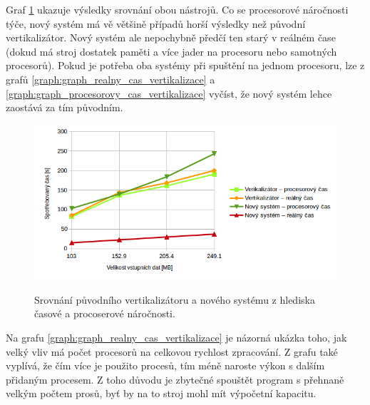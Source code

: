 Graf \ref{graph:graph_vertikalizator_vs_ja} ukazuje výsledky srovnání obou nástrojů.
Co se procesorové náročnosti týče, nový systém má vě většině případů horší výsledky
než původní vertikalizátor. Nový systém ale nepochybně předčí ten starý v reálném
čase (dokud má stroj dostatek paměti a více jader na procesoru nebo samotných procesorů). Pokud
je potřeba oba systémy při spuštění na jednom procesoru, lze z grafů \ref{graph:graph_realny_cas_vertikalizace}
a \ref{graph:graph_procesorovy_cas_vertikalizace} vyčíst, že nový systém lehce zaostává
za tím původním.

\begin{figure}[H]
    \begin{center}
        \label{graph:graph_vertikalizator_vs_ja}
        \includegraphics[width=1.0\textwidth]{obrazky-figures/graph_vertikalizator_vs_ja.png}
        \caption{Srovnání původního vertikalizátoru a nového systému z hlediska časové a procoserové náročnosti.}
    \end{center}
\end{figure}

Na grafu \ref{graph:graph_realny_cas_vertikalizace} je názorná ukázka toho, jak velký vliv má počet
procesorů na celkovou rychlost zpracování. Z grafu také vyplívá, že čím více je použito procesů,
tím méně naroste výkon s dalším přidaným procesem. Z toho důvodu je zbytečné spouštět
program s přehnaně velkým počtem prosů, byť by na to stroj mohl mít výpočetní kapacitu.

